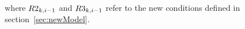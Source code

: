 where $R{2}_{k, i-1}$ and $R{3}_{k, i-1}$ refer to the new conditions defined in section~\ref{sec:newModel}.



\setcounter{equation}{\theoldequation}
\renewcommand{\theequation}{\arabic{equation}}
